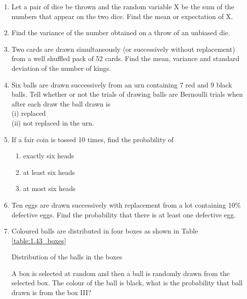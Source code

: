 \begin{enumerate}[label=\arabic*.,ref=\thesubsection.\theenumi]
\item Let a pair of dice be thrown and the random variable X be the sum of the numbers that appear on the two dice. Find the mean or expectation of X.\\

\item Find the variance of the number obtained on a throw of an unbiased die.\\

\item Two cards are drawn simultaneously (or successively without replacement) from a well shuffled pack of 52 cards. Find the mean, variance and standard deviation of the number of kings.\\

\item Six balls are drawn successively from an urn containing 7 red and 9 black balls. Tell whether or not the trials of drawing balls are Bernoulli trials when after each draw the ball drawn is\\
(i) replaced \\
(ii) not replaced in the urn.\\

\item If a fair coin is tossed 10 times, find the probability of
\begin{enumerate}
\item  exactly six heads
\item  at least six heads
\item  at most six  heads
\end{enumerate}
\solution


\item Ten eggs are drawn successively with replacement from a lot containing 10$\%$ defective eggs. Find the probability that there is at least one defective egg.\\
\solution


\item Coloured balls are distributed in four boxes as shown in Table \ref{table:1.43_boxes}

\begin{table}[ht!]
\centering

\caption{Distribution of the balls in the boxes}
\label{table:1.43_boxes}
\end{table}
A box is selected at random and then a ball is randomly drawn from the selected box. The colour of the ball is black, what is the probability that ball drawn is from the box III?
\\
\solution



\end{enumerate}
